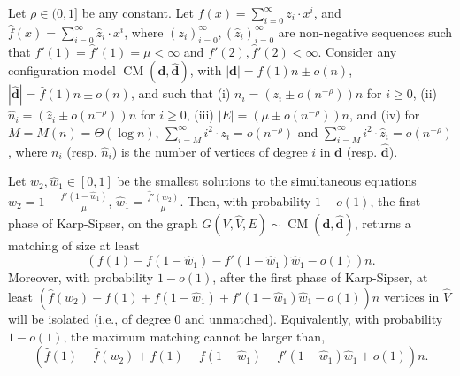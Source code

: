 \documentclass[11pt]{article}
\DeclareMathOperator*{\CM}{CM}
\newcommand{\maxdeg}{M}
\begin{document}
\begin{theorem}\label{thm:bg}Let $\rho\in(0,1]$ be any constant. Let $f(x)=\sum_{i=0}^\infty z_i\cdot x^i$, and $\hat{f}(x) = \sum_{i=0}^\infty \hat{z}_i\cdot x^i$, where $(z_i)_{i=0}^\infty, (\hat{z}_i)_{i=0}^\infty$ are non-negative sequences such that $f'(1)=\hat{f}'(1)=\mu < \infty$ and $f'(2), \hat{f}'(2) < \infty$.
Consider any configuration model $\CM(\mathbf{d}, \mathbf{\hat{d}})$, with $|\mathbf{d}|=f(1)n\pm o(n)$,  $|\mathbf{\hat{d}}|=\hat{f}(1)n \pm o(n)$, and such that (i) $n_i=(z_i\pm o(n^{-\rho}))n$ for $i\geq 0$,
(ii) $\hat{n}_i=(\hat{z}_i \pm o(n^{-\rho}))n$ for $i\geq 0$,
(iii) $|E|=(\mu \pm o(n^{-\rho}))n$,
and (iv) for $\maxdeg=\maxdeg(n)=\Theta(\log n)$, $\sum_{i=\maxdeg}^\infty i^2 \cdot z_i = o(n^{-\rho})$ and $\sum_{i=\maxdeg}^\infty i^2 \cdot \hat{z}_i = o(n^{-\rho})$,
where $n_i$ (resp. $\hat{n}_i$) is the number of vertices of degree $i$ in $\mathbf{d}$ (resp. $\mathbf{\hat{d}}$). 

Let $w_2, \hat{w}_1 \in [0,1]$ be the smallest solutions to the simultaneous equations $w_2=1 - \frac{f'(1-\hat{w}_1)}{\mu}$, $\hat{w}_1 = \frac{\hat{f}'(w_2)}{\mu}$. Then, with probability $1-o(1)$, the first phase of Karp-Sipser, on the graph $G(V, \hat{V},E)\sim\CM(\mathbf{d}, \mathbf{\hat{d}})$, returns a matching of size at least
\[
(f(1) - f(1-\hat{w}_1) - f'(1-\hat{w}_1)\hat{w}_1 - o(1))n.
\]
Moreover, with probability $1-o(1)$, after the first phase of Karp-Sipser, at least $(\hat{f}(w_2) - f(1) + f(1-\hat{w}_1)+f'(1-\hat{w}_1)\hat{w}_1 - o(1))n$ vertices in $\hat{V}$ will be isolated (i.e., of degree 0 and unmatched). Equivalently, with probability $1-o(1)$, the maximum matching cannot be larger than,
\[
(\hat{f}(1) - \hat{f}(w_2) + f(1) - f(1-\hat{w}_1) - f'(1-\hat{w}_1)\hat{w}_1 + o(1))n.
\]
\end{theorem}
\end{document}
